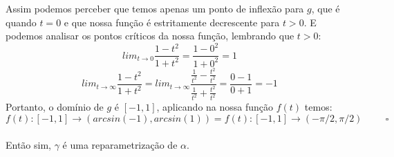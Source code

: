\documentclass{article}
\begin{document}
\begin{enumerate}
    Assim podemos perceber que temos apenas um ponto de inflexão para $g$, que é quando $t=0$ e que nossa função é estritamente decrescente para $t>0$.
    E podemos analisar os pontos críticos da nossa função, lembrando que $t>0$:
    $$ lim_{t \to 0} \frac{1-t^2}{1+t^2} = \frac{1-0^2}{1+0^2} = 1 $$
    $$ lim_{t \to \infty} \frac{1-t^2}{1+t^2} = lim_{t \to \infty} \frac{\frac{1}{t^2}-\frac{t^2}{t^2}}{\frac{1}{t^2}+\frac{t^2}{t^2}} = \frac{0-1}{0+1} = -1 $$
    Portanto, o domínio de $g$ é $[-1, 1]$, aplicando na nossa função $f(t)$ temos:
    $$ f(t) : [-1, 1] \to (arcsin(-1), arcsin(1)) = f(t) : [-1, 1] \to (-\pi/2, \pi/2) \hspace{1cm} \square $$
    \\
    Então sim, $\gamma$ é uma reparametrização de $\alpha$.
\end{enumerate}
\end{document}
